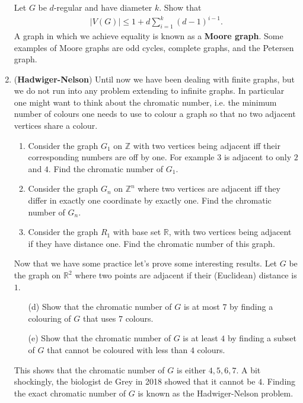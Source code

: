 \documentclass{article}
\newcommand{\question}[1]{\item (\textbf{#1})}
\theoremstyle{remark}
\begin{document}
\begin{enumerate}
    Let $G$ be $d$-regular and have diameter $k$. Show that
    \begin{align*}
        |V(G)| \leq 1 + d \sum_{i=1}^{k} (d-1)^{i-1}.
    \end{align*}
    A graph in which we achieve equality is known as a \textbf{Moore graph}. Some examples of Moore graphs are odd cycles, complete graphs, and the Petersen graph.
\question{Hadwiger-Nelson}
    Until now we have been dealing with finite graphs, but we do not run into any problem extending to infinite graphs. In particular one might want to think about the chromatic number, i.e. the minimum number of colours one needs to use to colour a graph so that no two adjacent vertices share a colour.
    \begin{enumerate}
        \item Consider the graph $G_1$ on $\mathbb{Z}$ with two vertices being adjacent iff their corresponding numbers are off by one. For example $3$ is adjacent to only $2$ and $4$. Find the chromatic number of $G_1$.
        \item Consider the graph $G_n$ on $\mathbb{Z}^n$ where two vertices are adjacent iff they differ in exactly one coordinate by exactly one. Find the chromatic number of $G_n$.
        \item Consider the graph $R_1$ with base set $\mathbb{R}$, with two vertices being adjacent if they have distance one. Find the chromatic number of this graph.
    \end{enumerate}
    Now that we have some practice let's prove some interesting results. Let $G$ be the graph on $\mathbb{R}^2$ where two points are adjacent if their (Euclidean) distance is $1$.
    \begin{enumerate}
        \item[(d)] Show that the chromatic number of $G$ is at most $7$ by finding a colouring of $G$ that uses $7$ colours.
        \item[(e)] Show that the chromatic number of $G$ is at least $4$ by finding a subset of $G$ that cannot be coloured with less than $4$ colours.
    \end{enumerate}
    This shows that the chromatic number of $G$ is either $4,5,6,7$. A bit shockingly, the biologist de Grey in 2018 showed that it cannot be $4$. Finding the exact chromatic number of $G$ is known as the Hadwiger-Nelson problem.


\end{enumerate}
\end{document}
